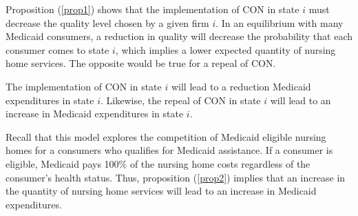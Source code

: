 \documentclass[../Main.tex]{subfiles}
\begin{document}
Proposition (\ref{prop1}) shows that the implementation of CON in state $i$ must decrease the quality level chosen by a given firm $i$. In an equilibrium with many Medicaid consumers, a reduction in quality will decrease the probability that each consumer comes to state $i$, which implies a lower expected quantity of nursing home services. The opposite would be true for a repeal of CON. 

\begin{Proposition} \label{prop3}
The implementation of CON in state $i$ will lead to a reduction Medicaid expenditures in state $i$. Likewise, the repeal of CON in state $i$ will lead to an increase in Medicaid expenditures in state $i$.  
\end{Proposition}

Recall that this model explores the competition of Medicaid eligible nursing homes for a consumers who qualifies for Medicaid assistance. If a consumer is eligible, Medicaid pays 100\% of the nursing home costs regardless of the consumer's health status. Thus, proposition (\ref{prop2}) implies that an increase in the quantity of nursing home services will lead to an increase in Medicaid expenditures.
\end{document}
